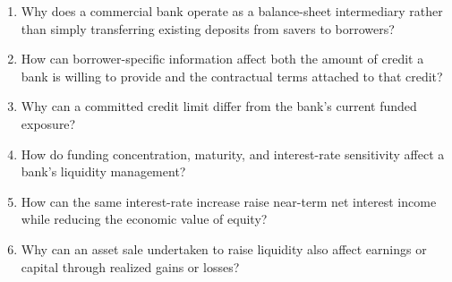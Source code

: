 

\begin{enumerate}

\item Why does a commercial bank operate as a balance-sheet intermediary rather than simply transferring existing deposits from savers to borrowers?

\item How can borrower-specific information affect both the amount of credit a bank is willing to provide and the contractual terms attached to that credit?

\item Why can a committed credit limit differ from the bank's current funded exposure?

\item How do funding concentration, maturity, and interest-rate sensitivity affect a bank's liquidity management?

\item How can the same interest-rate increase raise near-term net interest income while reducing the economic value of equity?

\item Why can an asset sale undertaken to raise liquidity also affect earnings or capital through realized gains or losses?

\end{enumerate}



